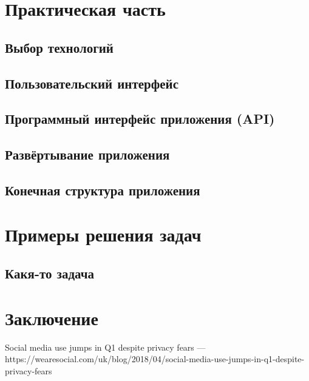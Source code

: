 \documentclass[14pt,a4paper]{scrartcl}
\begin{document}
    \newpage
    \section[Практическая часть]{Практическая часть}
    \subsection[Выбор технологий]{Выбор технологий}
    \subsection[Пользовательский интерфейс]{Пользовательский интерфейс}
    \subsection[Программный интерфейс приложения]{Программный интерфейс приложения (API)}
    \subsection[Развёртывание приложения]{Развёртывание приложения}
    \subsection[Конечная структура приложения]{Конечная структура приложения}

    \newpage
    \section[Примеры решения задач]{Примеры решения задач}
    \subsection[Какя-то задача]{Какя-то задача}

    \newpage
    \section[Заключение]{Заключение}

    \newpage
    \begin{thebibliography}{9}
        Social media use jumps in Q1 despite privacy fears
        \newblock --- https://wearesocial.com/uk/blog/2018/04/social-media-use-jumps-in-q1-despite-privacy-fears
    \end{thebibliography}
\end{document}
